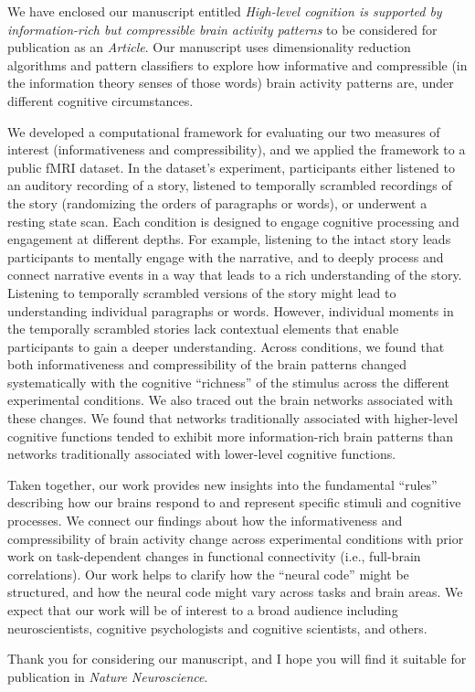 \documentclass[10pt,stdletter,orderfromtodate,sigleft]{newlfm}
\newcommand{\journal}{Nature Neuroscience}
\newcommand{\articletype}{Article}
\newcommand{\myTitle}{High-level cognition is supported by information-rich but compressible brain activity patterns}
\begin{document}
\begin{newlfm}

  We have enclosed our manuscript entitled \textit{\myTitle} to be considered
  for publication as an \textit{\articletype}. Our manuscript uses
  dimensionality reduction algorithms and pattern classifiers to explore how
  informative and compressible (in the information theory senses of those
  words) brain activity patterns are, under different cognitive circumstances.

  We developed a computational framework for evaluating our two measures of
  interest (informativeness and compressibility), and we applied the framework
  to a public fMRI dataset. In the dataset's experiment, participants either
  listened to an auditory recording of a story, listened to temporally
  scrambled recordings of the story (randomizing the orders of paragraphs or
  words), or underwent a resting state scan. Each condition is designed to
  engage cognitive processing and engagement at different depths. For example,
  listening to the intact story leads participants to mentally engage with the
  narrative, and to deeply process and connect narrative events in a way that
  leads to a rich understanding of the story. Listening to temporally scrambled
  versions of the story might lead to understanding individual paragraphs or
  words. However, individual moments in the temporally scrambled stories lack
  contextual elements that enable participants to gain a deeper understanding.
  Across conditions, we found that both informativeness and compressibility of
  the brain patterns changed systematically with the cognitive ``richness'' of
  the stimulus across the different experimental conditions. We also traced out
  the brain networks associated with these changes. We found that networks
  traditionally associated with higher-level cognitive functions tended to
  exhibit more information-rich brain patterns than networks traditionally
  associated with lower-level cognitive functions.

  Taken together, our work provides new insights into the fundamental ``rules''
  describing how our brains respond to and represent specific stimuli and
  cognitive processes. We connect our findings about how the informativeness
  and compressibility of brain activity change across experimental conditions
  with prior work on task-dependent changes in functional connectivity (i.e.,
  full-brain correlations). Our work helps to clarify how the ``neural code''
  might be structured, and how the neural code might vary across tasks and
  brain areas. We expect that our work will be of interest to a broad audience
  including neuroscientists, cognitive psychologists and cognitive scientists,
  and others.


Thank you for considering our manuscript, and I hope you will find it suitable
for publication in \textit{\journal}.


\end{newlfm}
\end{document}
